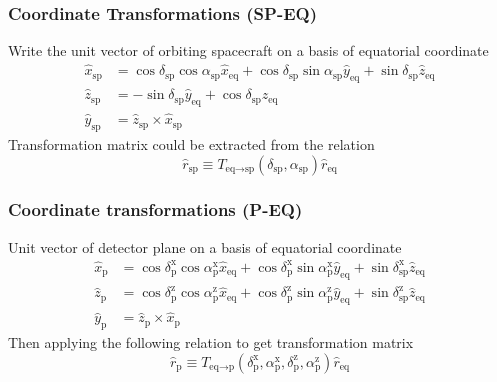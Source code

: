 \documentclass{beamer}
\begin{document}
\begin{frame}\frametitle{Coordinate Transformations (SP-EQ)}
  Write the unit vector of orbiting spacecraft on a basis of equatorial coordinate
  \begin{equation}
    \begin{split}
    \hat{x}_\text{sp} &= \cos\delta_\text{sp}\cos\alpha_\text{sp}\hat{x}_\text{eq} + \cos\delta_\text{sp}\sin\alpha_\text{sp}\hat{y}_\text{eq} + \sin\delta_\text{sp}\hat{z}_\text{eq}\\
    \hat{z}_\text{sp} &= - \sin\delta_\text{sp}\hat{y}_\text{eq} + \cos\delta_\text{sp}\hat{z}_\text{eq} \\
    \hat{y}_\text{sp} &= \hat{z}_\text{sp} \times \hat{x}_\text{sp}
    \end{split}
    \label{eq:tf_eq_sp}
  \end{equation}
  Transformation matrix could be extracted from the relation
  \begin{equation}
    \hat{r}_\text{sp} \equiv T_{\text{eq}\rightarrow\text{sp}} (\delta_\text{sp}, \alpha_\text{sp}) \hat{r}_\text{eq}
  \end{equation}
\end{frame}
\begin{frame}\frametitle{Coordinate transformations (P-EQ)}
Unit vector of detector plane on a basis of equatorial coordinate
\begin{equation}
  \begin{split}
  \hat{x}_\text{p} &= \cos\delta^\text{x}_\text{p}\cos\alpha^\text{x}_\text{p}\hat{x}_\text{eq} + \cos\delta^\text{x}_\text{p}\sin\alpha^\text{x}_\text{p}\hat{y}_\text{eq} + \sin\delta^\text{x}_\text{sp}\hat{z}_\text{eq}\\
  \hat{z}_\text{p} &= \cos\delta^\text{z}_\text{p}\cos\alpha^\text{z}_\text{p}\hat{x}_\text{eq} + \cos\delta^\text{z}_\text{p}\sin\alpha^\text{z}_\text{p}\hat{y}_\text{eq} + \sin\delta^\text{z}_\text{sp}\hat{z}_\text{eq}\\
  \hat{y}_\text{p} &= \hat{z}_\text{p} \times \hat{x}_\text{p}
  \end{split}
  \label{eq:tf_eq_p}
\end{equation}
Then applying the following relation to get transformation matrix
\begin{equation}
  \hat{r}_\text{p} \equiv T_{\text{eq}\rightarrow\text{p}} (\delta^\text{x}_\text{p}, \alpha^\text{x}_\text{p}, \delta^\text{z}_\text{p}, \alpha^\text{z}_\text{p}) \hat{r}_\text{eq}
\end{equation}
\end{frame}
\end{document}
